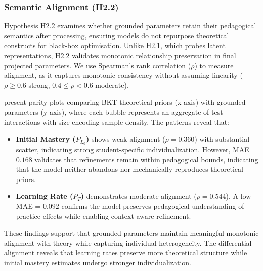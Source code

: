 \documentclass[applsci,article,submit,moreauthors,pdftex]{Definitions/mdpi}
\begin{document}
\subsubsection{Semantic Alignment (H2.2)} \label{sec_semantic_alignment}

Hypothesis H2.2 examines whether grounded parameters retain their pedagogical semantics after processing, ensuring models do not repurpose theoretical constructs for black-box optimisation. Unlike H2.1, which probes latent representations, H2.2 validates monotonic relationship preservation in final projected parameters. We use Spearman's rank correlation ($\rho$) to measure alignment, as it captures monotonic consistency without assuming linearity ($\rho \geq 0.6$ strong, $0.4 \leq \rho < 0.6$ moderate).

 present parity plots comparing BKT theoretical priors (x-axis) with grounded parameters (y-axis), where each bubble represents an aggregate of test interactions with size encoding sample density. The patterns reveal that:

\begin{itemize}
    \item \textbf{Initial Mastery ($P_{L_0}$)} shows weak alignment ($\rho = 0.360$) with substantial scatter, indicating strong student-specific individualization. However, MAE = $0.168$ validates that refinements remain within pedagogical bounds, indicating that the model neither abandons nor mechanically reproduces theoretical priors.
    \item \textbf{Learning Rate ($P_T$)} demonstrates moderate alignment ($\rho = 0.544$). A low MAE = $0.092$ confirms the model preserves pedagogical understanding of practice effects while enabling context-aware refinement.
\end{itemize}

These findings support that grounded parameters maintain meaningful monotonic alignment with theory while capturing individual heterogeneity. The differential alignment reveals that learning rates preserve more theoretical structure while initial mastery estimates undergo stronger individualization.
\end{document}
